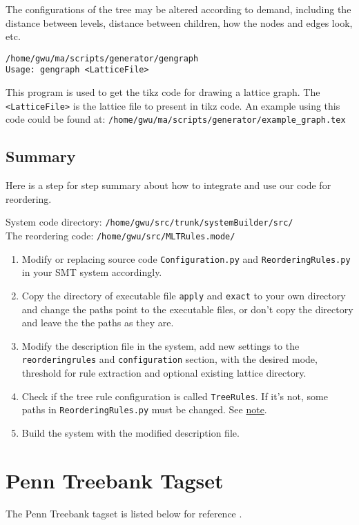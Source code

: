 The configurations of the tree may be altered according to demand, including the distance between levels, distance between children, how the nodes and edges look, etc.

\verb|/home/gwu/ma/scripts/generator/gengraph| \\
\verb|Usage: gengraph <LatticeFile>|

This program is used to get the tikz code for drawing a lattice graph. The \verb|<LatticeFile>| is the lattice file to present in tikz code. An example using this code could be found at:
\verb|/home/gwu/ma/scripts/generator/example_graph.tex|
	
\subsection{Summary}
\label{summary}

Here is a step for step summary about how to integrate and use our code for reordering.

System code directory: \verb|/home/gwu/src/trunk/systemBuilder/src/|\\
The reordering code: \verb|/home/gwu/src/MLTRules.mode/|

\begin{enumerate}
\item Modify or replacing source code \verb|Configuration.py| and \verb|ReorderingRules.py| in your SMT system accordingly.
\item Copy the directory of executable file \verb|apply| and \verb|exact| to your own directory and change the paths point to the executable files, or don't copy the directory and leave the the paths as they are.
\item Modify the description file in the system, add new settings to the \verb|reorderingrules| and \verb|configuration| section, with the desired mode, threshold for rule extraction and optional existing lattice directory.
\item Check if the tree rule configuration is called \verb|TreeRules|. If it's not, some paths in \verb|ReorderingRules.py| must be changed. See \hyperref[note]{note}.
\item Build the system with the modified description file.
\end{enumerate}

\newpage
\section{Penn Treebank Tagset}
\label{tagset}
The Penn Treebank tagset is listed below for reference \citep{penn, penn3}.


